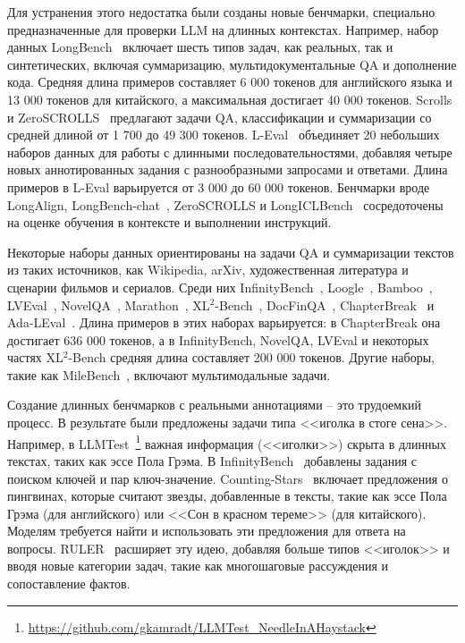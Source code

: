Для устранения этого недостатка были созданы новые бенчмарки, специально предназначенные для проверки LLM на длинных контекстах. Например, набор данных LongBench~\cite{bai2023longbench} включает шесть типов задач, как реальных, так и синтетических, включая суммаризацию, мультидокументальные QA и дополнение кода. Средняя длина примеров составляет 6 000 токенов для английского языка и 13 000 токенов для китайского, а максимальная достигает 40 000 токенов. Scrolls и ZeroSCROLLS~\cite{shaham2022scrolls,zeroscrolls_shaham2023} предлагают задачи QA, классификации и суммаризации со средней длиной от 1 700 до 49 300 токенов. L-Eval~\cite{l_eval_an2023} объединяет 20 небольших наборов данных для работы с длинными последовательностями, добавляя четыре новых аннотированных задания с разнообразными запросами и ответами. Длина примеров в L-Eval варьируется от 3 000 до 60 000 токенов. Бенчмарки вроде LongAlign, LongBench-chat~\cite{bai2024longalign}, ZeroSCROLLS и LongICLBench~\cite{li2024LongICLBench} сосредоточены на оценке обучения в контексте и выполнении инструкций.

Некоторые наборы данных ориентированы на задачи QA и суммаризации текстов из таких источников, как Wikipedia, arXiv, художественная литература и сценарии фильмов и сериалов. Среди них InfinityBench~\cite{zhang2024inftybench}, Loogle~\cite{li2023loogle}, Bamboo~\cite{dong2023bamboo}, LVEval~\cite{yuan2024lveval}, NovelQA~\cite{wang2024novelqa}, Marathon~\cite{zhang2023marathon}, XL$^2$-Bench~\cite{ni2024xlbench}, DocFinQA~\cite{reddy2024docfinqa}, ChapterBreak~\cite{sun2022chapterbreak} и Ada-LEval~\cite{wang2024adaleval}. Длина примеров в этих наборах варьируется: в ChapterBreak она достигает 636 000 токенов, а в InfinityBench, NovelQA, LVEval и некоторых частях XL$^2$-Bench средняя длина составляет 200 000 токенов. Другие наборы, такие как MileBench~\cite{song2024milebench}, включают мультимодальные задачи.

Создание длинных бенчмарков с реальными аннотациями – это трудоемкий процесс. В результате были предложены задачи типа <<иголка в стоге сена>>. Например, в LLMTest~\footnote{\url{https://github.com/gkamradt/LLMTest_NeedleInAHaystack}} важная информация (<<иголки>>) скрыта в длинных текстах, таких как эссе Пола Грэма. В InfinityBench~\cite{zhang2024inftybench} добавлены задания с поиском ключей и пар ключ-значение. Counting-Stars~\cite{song2024countingstars} включает предложения о пингвинах, которые считают звезды, добавленные в тексты, такие как эссе Пола Грэма (для английского) или <<Сон в красном тереме>> (для китайского). Моделям требуется найти и использовать эти предложения для ответа на вопросы. RULER~\cite{hsieh2024ruler} расширяет эту идею, добавляя больше типов <<иголок>> и вводя новые категории задач, такие как многошаговые рассуждения и сопоставление фактов.

